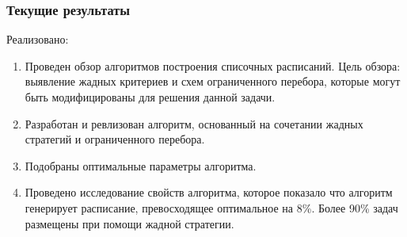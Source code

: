 \begin{frame}
    \frametitle{Текущие результаты}
    Реализовано:
    \begin{enumerate}
        \item Проведен обзор алгоритмов построения списочных расписаний. Цель обзора: выявление жадных критериев и схем ограниченного перебора, которые могут быть модифицированы для решения данной задачи.
        \item Разработан и ревлизован алгоритм, основанный на сочетании жадных стратегий и ограниченного перебора.
        \item Подобраны оптимальные параметры алгоритма.
        \item Проведено исследование свойств алгоритма, которое показало что алгоритм генерирует расписание, превосходящее оптимальное на 8\%. Более 90\% задач размещены при помощи жадной стратегии.
    \end{enumerate}
\end{frame}